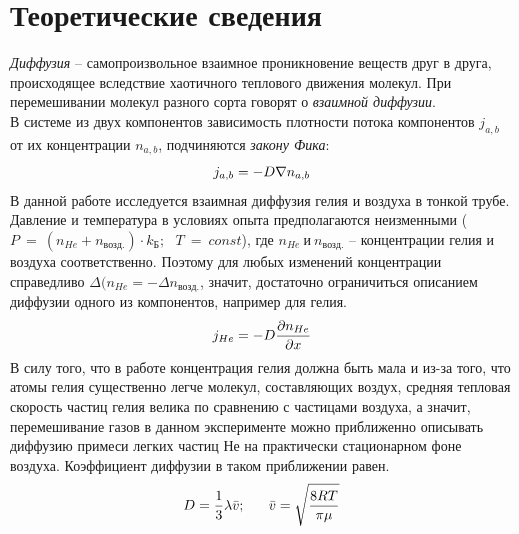 \section{Теоретические сведения}
\textit{Диффузия} -- самопроизвольное взаимное проникновение веществ друг в друга, происходящее вследствие хаотичного теплового движения молекул. При перемешивании молекул разного сорта говорят о \textit{взаимной диффузии}.\\
В системе из двух компонентов зависимость плотности потока компонентов $j_{a,b}$ от их концентрации $n_{a,b}$, подчиняются \textit{закону Фика}:
\begin{equation*}
j_{a,b} = -D\nabla{n_{a,b}}\\
\end{equation*}
В данной работе исследуется взаимная диффузия гелия и воздуха в тонкой трубе. Давление и температура в условиях опыта предполагаются неизменными ($P\ =\ (n_{He}+n_{возд.}) \cdot k_Б; \ \ \ T\ =\ const$), где $n_{He}\ и\ n_{возд.}$ -- концентрации гелия и воздуха соответственно. Поэтому для любых изменений концентрации справедливо $\Delta (n_{He} = - \Delta n_{возд.}$, значит, достаточно ограничиться описанием диффузии одного из компонентов, например для гелия. \\
\begin{equation*}
j_{He} = -D\frac{\partial n_{He}}{\partial x}\\
\end{equation*}
В силу того, что в работе концентрация гелия должна быть мала и из-за того, что атомы гелия существенно легче молекул, составляющих воздух, средняя тепловая скорость частиц гелия велика по сравнению с частицами воздуха, а значит, перемешивание газов в данном эксперименте можно приближенно описывать диффузию примеси легких частиц Не на практически стационарном фоне воздуха. Коэффициент диффузии в таком приближении равен.  \\
\begin{equation*}
D = \frac{1}{3} \lambda \bar{v}; \ \ \ \ \ \bar{v} = \sqrt{\frac{8RT}{\pi \mu}}\\
\end{equation*}
